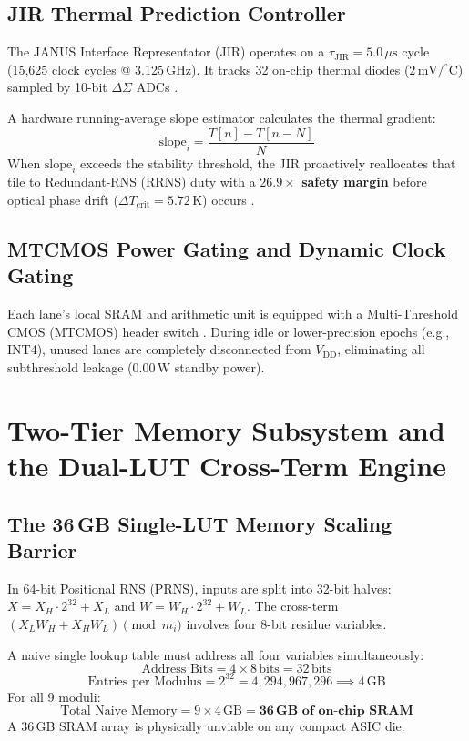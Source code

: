 \documentclass[10pt,journal,compsoc]{IEEEtran}
\begin{document}
\subsection{JIR Thermal Prediction Controller}
The JANUS Interface Representator (JIR) operates on a $\tau_{\text{JIR}} = 5.0\,\mu\text{s}$ cycle (15,625 clock cycles @ 3.125\,GHz). It tracks 32 on-chip thermal diodes ($2\,\text{mV}/^\circ\text{C}$) sampled by 10-bit $\Delta\Sigma$ ADCs \cite{schreier2005deltasigma, ti_tmp117}.

A hardware running-average slope estimator calculates the thermal gradient:
\begin{equation}
\text{slope}_i = \frac{T[n] - T[n-N]}{N}
\end{equation}
When $\text{slope}_i$ exceeds the stability threshold, the JIR proactively reallocates that tile to Redundant-RNS (RRNS) duty with a \textbf{$26.9\times$ safety margin} before optical phase drift ($\Delta T_{\text{crit}} = 5.72\,\text{K}$) occurs \cite{intel_alder_lake_pmc}.

\subsection{MTCMOS Power Gating and Dynamic Clock Gating}
Each lane's local SRAM and arithmetic unit is equipped with a Multi-Threshold CMOS (MTCMOS) header switch \cite{tiwari1998power, arm_cortex_a76_trm}. During idle or lower-precision epochs (e.g., INT4), unused lanes are completely disconnected from $V_{\text{DD}}$, eliminating all subthreshold leakage ($0.00\,\text{W}$ standby power).

\section{Two-Tier Memory Subsystem and the Dual-LUT Cross-Term Engine}\label{sec:memory}

\subsection{The 36\,GB Single-LUT Memory Scaling Barrier}
In 64-bit Positional RNS (PRNS), inputs are split into 32-bit halves: $X = X_H \cdot 2^{32} + X_L$ and $W = W_H \cdot 2^{32} + W_L$. The cross-term $(X_L W_H + X_H W_L) \pmod{m_i}$ involves four 8-bit residue variables.

A naive single lookup table must address all four variables simultaneously:
\begin{equation}
\text{Address Bits} = 4 \times 8\,\text{bits} = 32\,\text{bits}
\end{equation}
\begin{equation}
\text{Entries per Modulus} = 2^{32} = 4,294,967,296 \implies 4\,\text{GB}
\end{equation}
For all 9 moduli:
\begin{equation}
\text{Total Naive Memory} = 9 \times 4\,\text{GB} = \mathbf{36\,\text{GB of on-chip SRAM}}
\end{equation}
A 36\,GB SRAM array is physically unviable on any compact ASIC die.
\end{document}
